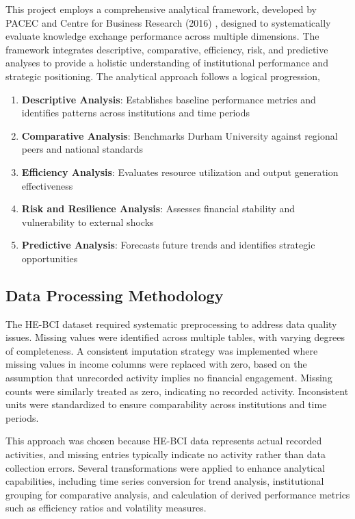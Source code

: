 \documentclass[journal,onecolumn, 10pt,draftclsnofoot]{IEEEtran}
\begin{document}
This project employs a comprehensive analytical framework, developed by PACEC and Centre for Business Research (2016) \cite{pacec2016state}, designed to systematically evaluate knowledge exchange performance across multiple dimensions. The framework integrates descriptive, comparative, efficiency, risk, and predictive analyses to provide a holistic understanding of institutional performance and strategic positioning. The analytical approach follows a logical progression,
\begin{enumerate}
    \item \textbf{Descriptive Analysis}: Establishes baseline performance metrics and identifies patterns across institutions and time periods
    \item \textbf{Comparative Analysis}: Benchmarks Durham University against regional peers and national standards
    \item \textbf{Efficiency Analysis}: Evaluates resource utilization and output generation effectiveness
    \item \textbf{Risk and Resilience Analysis}: Assesses financial stability and vulnerability to external shocks
    \item \textbf{Predictive Analysis}: Forecasts future trends and identifies strategic opportunities
\end{enumerate}

\subsection{Data Processing Methodology}

The HE-BCI dataset required systematic preprocessing to address data quality issues. Missing values were identified across multiple tables, with varying degrees of completeness. A consistent imputation strategy was implemented where missing values in income columns were replaced with zero, based on the assumption that unrecorded activity implies no financial engagement. Missing counts were similarly treated as zero, indicating no recorded activity. Inconsistent units were standardized to ensure comparability across institutions and time periods.

This approach was chosen because HE-BCI data represents actual recorded activities, and missing entries typically indicate no activity rather than data collection errors. Several transformations were applied to enhance analytical capabilities, including time series conversion for trend analysis, institutional grouping for comparative analysis, and calculation of derived performance metrics such as efficiency ratios and volatility measures.
\end{document}

